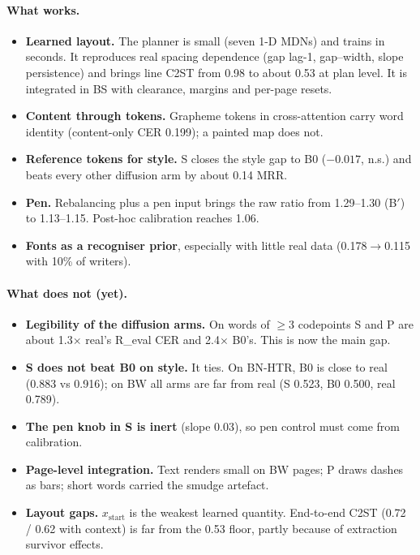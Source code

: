 \documentclass[10.5pt,a4paper]{article}
\newcommand{\Bp}{B$'$}
\begin{document}
\paragraph{What works.}
\begin{itemize}
\item \textbf{Learned layout.} The planner is small (seven 1-D MDNs) and trains in seconds. It reproduces real spacing
  dependence (gap lag-1, gap--width, slope persistence) and brings line C2ST from 0.98 to about 0.53 at plan level. It is
  integrated in BS with clearance, margins and per-page resets.
\item \textbf{Content through tokens.} Grapheme tokens in cross-attention carry word identity (content-only CER 0.199); a
  painted map does not.
\item \textbf{Reference tokens for style.} S closes the style gap to B0 ($-0.017$, n.s.) and beats every other diffusion arm
  by about 0.14 MRR.
\item \textbf{Pen.} Rebalancing plus a pen input brings the raw ratio from 1.29--1.30 (\Bp) to 1.13--1.15. Post-hoc
  calibration reaches 1.06.
\item \textbf{Fonts as a recogniser prior}, especially with little real data (0.178$\to$0.115 with 10\% of writers).
\end{itemize}

\paragraph{What does not (yet).}
\begin{itemize}
\item \textbf{Legibility of the diffusion arms.} On words of $\ge$3 codepoints S and P are about 1.3$\times$ real's R\_eval
  CER and 2.4$\times$ B0's. This is now the main gap.
\item \textbf{S does not beat B0 on style.} It ties. On BN-HTR, B0 is close to real (0.883 vs 0.916); on BW all arms are
  far from real (S 0.523, B0 0.500, real 0.789).
\item \textbf{The pen knob in S is inert} (slope 0.03), so pen control must come from calibration.
\item \textbf{Page-level integration.} Text renders small on BW pages; P draws dashes as bars; short words carried the smudge
  artefact.
\item \textbf{Layout gaps.} $x_\mathrm{start}$ is the weakest learned quantity. End-to-end C2ST (0.72 / 0.62 with context)
  is far from the 0.53 floor, partly because of extraction survivor effects.
\end{itemize}
\end{document}
